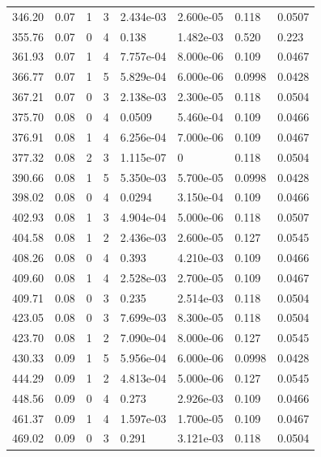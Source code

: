 \documentclass[preview]{standalone}
\begin{document}
{{{\begin{tabular}{L{1.2cm}C{1.2cm} C{0.3cm}C{0.5cm} C{1.4cm}C{1.4cm} C{1.4cm}C{1.4cm}}
  346.20  &  0.07  & 1     &  3 &  2.434e-03  & 2.600e-05  & 0.118 &  0.0507   \\ 
  355.76  &  0.07  & 0     &  4 &  0.138  & 1.482e-03  & 0.520 &  0.223   \\ 
  361.93  &  0.07  & 1     &  4 &  7.757e-04  & 8.000e-06  & 0.109 &  0.0467   \\ 
  366.77  &  0.07  & 1     &  5 &  5.829e-04  & 6.000e-06  & 0.0998 &  0.0428   \\ 
  367.21  &  0.07  & 0     &  3 &  2.138e-03  & 2.300e-05  & 0.118 &  0.0504   \\ 
  375.70  &  0.08  & 0     &  4 &  0.0509  & 5.460e-04  & 0.109 &  0.0466   \\ 
  376.91  &  0.08  & 1     &  4 &  6.256e-04  & 7.000e-06  & 0.109 &  0.0467   \\ 
  377.32  &  0.08  & 2     &  3 &  1.115e-07  & 0  & 0.118 &  0.0504   \\ 
  390.66  &  0.08  & 1     &  5 &  5.350e-03  & 5.700e-05  & 0.0998 &  0.0428   \\ 
  398.02  &  0.08  & 0     &  4 &  0.0294  & 3.150e-04  & 0.109 &  0.0466   \\ 
  402.93  &  0.08  & 1     &  3 &  4.904e-04  & 5.000e-06  & 0.118 &  0.0507   \\ 
  404.58  &  0.08  & 1     &  2 &  2.436e-03  & 2.600e-05  & 0.127 &  0.0545   \\ 
  408.26  &  0.08  & 0     &  4 &  0.393  & 4.210e-03  & 0.109 &  0.0466   \\ 
  409.60  &  0.08  & 1     &  4 &  2.528e-03  & 2.700e-05  & 0.109 &  0.0467   \\ 
  409.71  &  0.08  & 0     &  3 &  0.235  & 2.514e-03  & 0.118 &  0.0504   \\ 
  423.05  &  0.08  & 0     &  3 &  7.699e-03  & 8.300e-05  & 0.118 &  0.0504   \\ 
  423.70  &  0.08  & 1     &  2 &  7.090e-04  & 8.000e-06  & 0.127 &  0.0545   \\ 
  430.33  &  0.09  & 1     &  5 &  5.956e-04  & 6.000e-06  & 0.0998 &  0.0428   \\ 
  444.29  &  0.09  & 1     &  2 &  4.813e-04  & 5.000e-06  & 0.127 &  0.0545   \\ 
  448.56  &  0.09  & 0     &  4 &  0.273  & 2.926e-03  & 0.109 &  0.0466   \\ 
  461.37  &  0.09  & 1     &  4 &  1.597e-03  & 1.700e-05  & 0.109 &  0.0467   \\ 
  469.02  &  0.09  & 0     &  3 &  0.291  & 3.121e-03  & 0.118 &  0.0504   \\ 

\end{tabular}}}}
\end{document}
